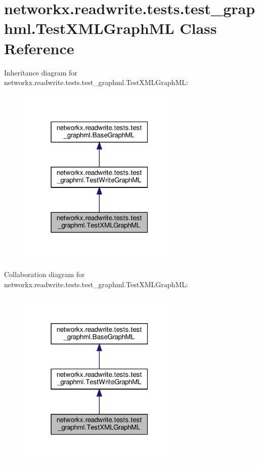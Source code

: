 \hypertarget{classnetworkx_1_1readwrite_1_1tests_1_1test__graphml_1_1TestXMLGraphML}{}\section{networkx.\+readwrite.\+tests.\+test\+\_\+graphml.\+Test\+X\+M\+L\+Graph\+ML Class Reference}
\label{classnetworkx_1_1readwrite_1_1tests_1_1test__graphml_1_1TestXMLGraphML}


Inheritance diagram for networkx.\+readwrite.\+tests.\+test\+\_\+graphml.\+Test\+X\+M\+L\+Graph\+ML\+:
\nopagebreak
\begin{figure}[H]
\begin{center}
\leavevmode
\includegraphics[width=223pt]{classnetworkx_1_1readwrite_1_1tests_1_1test__graphml_1_1TestXMLGraphML__inherit__graph}
\end{center}
\end{figure}


Collaboration diagram for networkx.\+readwrite.\+tests.\+test\+\_\+graphml.\+Test\+X\+M\+L\+Graph\+ML\+:
\nopagebreak
\begin{figure}[H]
\begin{center}
\leavevmode
\includegraphics[width=223pt]{classnetworkx_1_1readwrite_1_1tests_1_1test__graphml_1_1TestXMLGraphML__coll__graph}
\end{center}
\end{figure}
